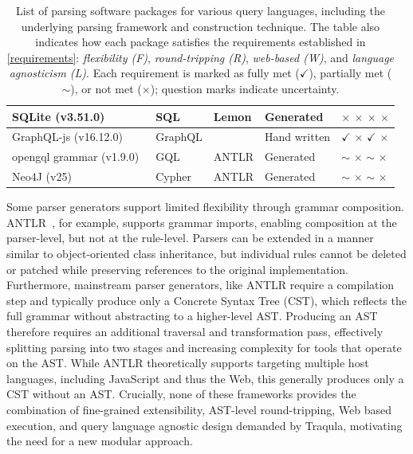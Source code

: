 \documentclass[runningheads]{llncs}
\begin{document}
\begin{table}[t]
\begin{tabularx}{\textwidth}{|L|l|l|l|l|}
\hline
SQLite (v3.51.0)~\cite{sqlite} & SQL & Lemon & Generated & $\times$ $\times$ $\times$ $\times$ \\
\hline
GraphQL-js (v16.12.0)~\cite{graphql-js} & GraphQL &  & Hand written & $\checkmark$ $\times$ $\checkmark$ $\times$ \\
\hline
opengql grammar (v1.9.0)~\cite{opengql} & GQL & ANTLR & Generated & $\sim$ $\times$ $\sim$ $\times$ \\
\hline
Neo4J (v25)~\cite{neo4j} & Cypher & ANTLR & Generated & $\sim$ $\times$ $\sim$ $\times$ \\
\hline
        \end{tabularx}
        \caption{List of parsing software packages for various query languages,
            including the underlying parsing framework and construction technique.
            The table also indicates how each package satisfies the requirements established in \autoref{requirements}:
            \textit{flexibility (F)},
            \textit{round-tripping (R)},
            \textit{web-based (W)}, and
            \textit{language agnosticism (L)}.
            Each requirement is marked as fully met ($\checkmark$), partially met ($\sim$), or not met ($\times$);
            question marks indicate uncertainty.}
        \vspace{-30pt}
    \end{table}

    Some parser generators support limited flexibility through grammar composition.
    ANTLR~\cite{parr1995antlr}, for example, supports grammar imports,
    enabling composition at the parser-level, but not at the rule-level.
    Parsers can be extended in a manner similar to object-oriented class inheritance,
    but individual rules cannot be deleted or patched while preserving references to the original implementation.
    Furthermore, mainstream parser generators, like ANTLR require a compilation step and typically produce only a
    Concrete Syntax Tree (CST), which reflects the full grammar without abstracting to a higher-level AST.
    Producing an AST therefore requires an additional traversal and transformation pass,
    effectively splitting parsing into two stages and increasing complexity for tools that operate on the AST.
    While ANTLR theoretically supports targeting multiple host languages, including JavaScript and thus the Web,
    this generally produces only a CST without an AST.
    Crucially, none of these frameworks provides the combination of fine-grained extensibility,
    AST-level round-tripping, Web based execution, and query language agnostic design demanded by Traqula,
    motivating the need for a new modular approach.
\end{document}
